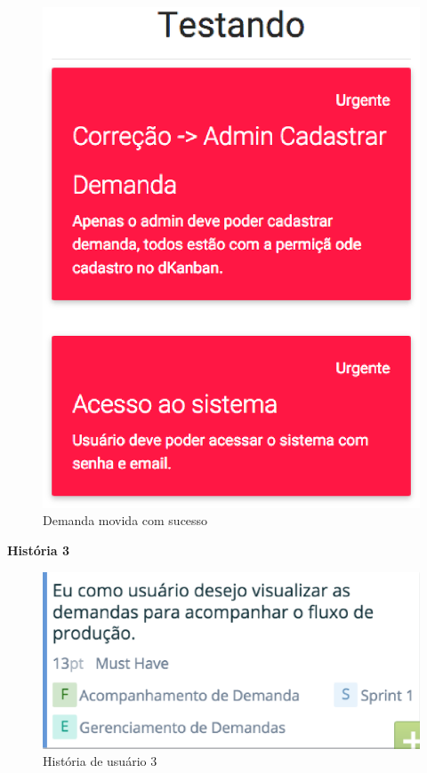 \begin{figure}[H]
    \centering
	\includegraphics[keepaspectratio=true,scale=0.5]{figuras/sprint6.eps}
    \caption{Demanda movida com sucesso}
    \label{}
\end{figure}


\textbf{História 3}

\begin{figure}[H]
    \centering
	\includegraphics[keepaspectratio=true,scale=0.6]{figuras/sprint8.eps}
    \caption{História de usuário 3}
    \label{}
\end{figure}

